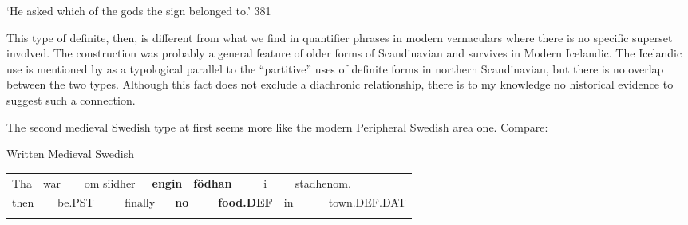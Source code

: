 \begin{styleTranslation}
‘He asked which of the gods the sign belonged to.’ 381

\end{styleTranslation}

\begin{styleBodyTextFirst}
This type of definite, then, is different from what we find in quantifier phrases in modern vernaculars where there is no specific superset involved. The construction was probably a general feature of older forms of Scandinavian and survives in Modern Icelandic. The Icelandic use is mentioned by \citet{Riesler2002} as a typological parallel to the “partitive” uses of definite forms in northern Scandinavian, but there is no overlap between the two types. Although this fact does not exclude a diachronic relationship, there is to my knowledge no historical evidence to suggest such a connection.

\end{styleBodyTextFirst}

\begin{styleBodytextC}
The second medieval Swedish type at first seems more like the modern Peripheral Swedish area one. Compare:

\end{styleBodytextC}


\begin{listWWNumileveli}
\item 

\begin{styleExample}
\label{bkm:Ref78603361}Written Medieval Swedish

\end{styleExample}

\end{listWWNumileveli}

\begin{tabular}{llllllllllllll}
\lsptoprule
Tha & \multicolumn{2}{l}{war

} & \multicolumn{2}{l}{om siidher

} & \multicolumn{2}{l}{{\bfseries engin}

} & \multicolumn{2}{l}{{\bfseries födhan}

} & \multicolumn{2}{l}{i

} & \multicolumn{2}{l}{stadhenom.

} & \\
\multicolumn{2}{l}{then

} & \multicolumn{2}{l}{be.PST

} & \multicolumn{2}{l}{finally

} & \multicolumn{2}{l}{{\bfseries no}

} & \multicolumn{2}{l}{{\bfseries food.DEF}

} & \multicolumn{2}{l}{in

} & \multicolumn{2}{l}{town.DEF.DAT

}\\
\lspbottomrule
\end{tabular}

